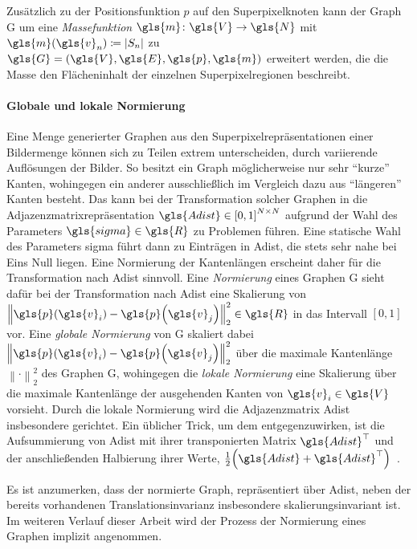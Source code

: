 Zusätzlich zu der Positionsfunktion $p$ auf den Superpixelknoten kann der Graph \gls{G} um eine \emph{Massefunktion} $\gls{m} \colon \gls{V} \to \gls{N}$ mit $\gls{m}\left(\gls{v}_n\right) \coloneqq \left|S_n\right|$ zu $\gls{G} = \left(\gls{V}, \gls{E}, \gls{p}, \gls{m}\right)$ erweitert werden, die die Masse \bzw{} den Flächeninhalt der einzelnen Superpixelregionen beschreibt.

\paragraph{Globale und lokale Normierung}
\label{globale_lokale_normierung}

Eine Menge generierter Graphen aus den Superpixelrepräsentationen einer Bildermenge können sich zu Teilen extrem unterscheiden, \bspw{} durch variierende Auflösungen der Bilder.
So besitzt ein Graph möglicherweise nur sehr \enquote{kurze} Kanten, wohingegen ein anderer ausschließlich im Vergleich dazu aus \enquote{längeren} Kanten besteht.
Das kann bei der Transformation solcher Graphen in die Adjazenzmatrixrepräsentation $\gls{Adist} \in {\left[0, 1\right]}^{N \times N}$ aufgrund der Wahl des Parameters $\gls{sigma} \in \gls{R}$ zu Problemen führen.
Eine statische Wahl des Parameters \gls{sigma} führt dann \ggf{} zu Einträgen in \gls{Adist}, die stets sehr nahe bei Eins \bzw{} Null liegen.
Eine Normierung der Kantenlängen erscheint daher für die Transformation nach \gls{Adist} sinnvoll.
Eine \emph{Normierung} eines Graphen \gls{G} sieht dafür bei der Transformation nach \gls{Adist} eine Skalierung von ${\left\|\gls{p}\left(\gls{v}_i\right) - \gls{p}\left(\gls{v}_j\right)\right\|}_2^2 \in \gls{R}$ in das Intervall $\left[0, 1\right]$ vor.
Eine \emph{globale Normierung} von \gls{G} skaliert dabei ${\left\|\gls{p}\left(\gls{v}_i\right) - \gls{p}\left(\gls{v}_j\right)\right\|}_2^2$ über die maximale Kantenlänge ${\left\|\cdot\right\|}_2^2$ des Graphen \gls{G}, wohingegen die \emph{lokale Normierung} eine Skalierung über die maximale Kantenlänge der ausgehenden Kanten von $\gls{v}_i \in \gls{V}$ vorsieht.
Durch die lokale Normierung wird die Adjazenzmatrix \gls{Adist} insbesondere gerichtet.
Ein üblicher Trick, um dem entgegenzuwirken, ist die Aufsummierung von \gls{Adist} mit ihrer transponierten Matrix $\gls{Adist}^{\top}$ und der anschließenden Halbierung ihrer Werte, \dhe{} $\frac{1}{2}\left(\gls{Adist} + \gls{Adist}^{\top}\right)$~\cite{Reuter}.

Es ist anzumerken, dass der normierte Graph, repräsentiert über \gls{Adist}, neben der bereits vorhandenen Translationsinvarianz insbesondere skalierungsinvariant ist.
Im weiteren Verlauf dieser Arbeit wird der Prozess der Normierung eines Graphen implizit angenommen.

